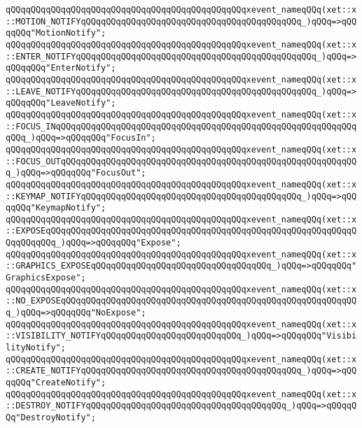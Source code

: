 \verb|qQQqqQQqqQQqqQQqqQQqqQQqqQQqqQQqqQQqqQQqqQQqqQQqxevent_nameqQQq(xet::x::MOTION_NOTIFYqQQqqQQqqQQqqQQqqQQqqQQqqQQqqQQqqQQqqQQqqQQq_)qQQq=>qQQqqQQq"MotionNotify";|\newline
\verb|qQQqqQQqqQQqqQQqqQQqqQQqqQQqqQQqqQQqqQQqqQQqqQQqxevent_nameqQQq(xet::x::ENTER_NOTIFYqQQqqQQqqQQqqQQqqQQqqQQqqQQqqQQqqQQqqQQqqQQqqQQq_)qQQq=>qQQqqQQq"EnterNotify";|\newline
\verb|qQQqqQQqqQQqqQQqqQQqqQQqqQQqqQQqqQQqqQQqqQQqqQQqxevent_nameqQQq(xet::x::LEAVE_NOTIFYqQQqqQQqqQQqqQQqqQQqqQQqqQQqqQQqqQQqqQQqqQQqqQQq_)qQQq=>qQQqqQQq"LeaveNotify";|\newline
\verb|qQQqqQQqqQQqqQQqqQQqqQQqqQQqqQQqqQQqqQQqqQQqqQQqxevent_nameqQQq(xet::x::FOCUS_INqQQqqQQqqQQqqQQqqQQqqQQqqQQqqQQqqQQqqQQqqQQqqQQqqQQqqQQqqQQqqQQq_)qQQq=>qQQqqQQq"FocusIn";|\newline
\verb|qQQqqQQqqQQqqQQqqQQqqQQqqQQqqQQqqQQqqQQqqQQqqQQqxevent_nameqQQq(xet::x::FOCUS_OUTqQQqqQQqqQQqqQQqqQQqqQQqqQQqqQQqqQQqqQQqqQQqqQQqqQQqqQQqqQQq_)qQQq=>qQQqqQQq"FocusOut";|\newline
\verb|qQQqqQQqqQQqqQQqqQQqqQQqqQQqqQQqqQQqqQQqqQQqqQQqxevent_nameqQQq(xet::x::KEYMAP_NOTIFYqQQqqQQqqQQqqQQqqQQqqQQqqQQqqQQqqQQqqQQqqQQq_)qQQq=>qQQqqQQq"KeymapNotify";|\newline
\verb|qQQqqQQqqQQqqQQqqQQqqQQqqQQqqQQqqQQqqQQqqQQqqQQqxevent_nameqQQq(xet::x::EXPOSEqQQqqQQqqQQqqQQqqQQqqQQqqQQqqQQqqQQqqQQqqQQqqQQqqQQqqQQqqQQqqQQqqQQqqQQq_)qQQq=>qQQqqQQq"Expose";|\newline
\verb|qQQqqQQqqQQqqQQqqQQqqQQqqQQqqQQqqQQqqQQqqQQqqQQqxevent_nameqQQq(xet::x::GRAPHICS_EXPOSEqQQqqQQqqQQqqQQqqQQqqQQqqQQqqQQqqQQq_)qQQq=>qQQqqQQq"GraphicsExpose";|\newline
\verb|qQQqqQQqqQQqqQQqqQQqqQQqqQQqqQQqqQQqqQQqqQQqqQQqxevent_nameqQQq(xet::x::NO_EXPOSEqQQqqQQqqQQqqQQqqQQqqQQqqQQqqQQqqQQqqQQqqQQqqQQqqQQqqQQqqQQq_)qQQq=>qQQqqQQq"NoExpose";|\newline
\verb|qQQqqQQqqQQqqQQqqQQqqQQqqQQqqQQqqQQqqQQqqQQqqQQqxevent_nameqQQq(xet::x::VISIBILITY_NOTIFYqQQqqQQqqQQqqQQqqQQqqQQqqQQq_)qQQq=>qQQqqQQq"VisibilityNotify";|\newline
\verb|qQQqqQQqqQQqqQQqqQQqqQQqqQQqqQQqqQQqqQQqqQQqqQQqxevent_nameqQQq(xet::x::CREATE_NOTIFYqQQqqQQqqQQqqQQqqQQqqQQqqQQqqQQqqQQqqQQqqQQq_)qQQq=>qQQqqQQq"CreateNotify";|\newline
\verb|qQQqqQQqqQQqqQQqqQQqqQQqqQQqqQQqqQQqqQQqqQQqqQQqxevent_nameqQQq(xet::x::DESTROY_NOTIFYqQQqqQQqqQQqqQQqqQQqqQQqqQQqqQQqqQQqqQQq_)qQQq=>qQQqqQQq"DestroyNotify";|\newline
